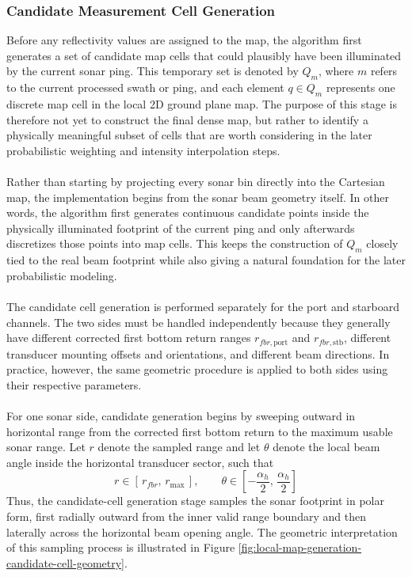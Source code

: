 \subsubsection{Candidate Measurement Cell Generation}
Before any reflectivity values are assigned to the map, the algorithm first generates a set of candidate map cells that could plausibly have been illuminated by the current sonar ping. This temporary set is denoted by $Q_m$, where $m$ refers to the current processed swath or ping, and each element $q \in Q_m$ represents one discrete map cell in the local 2D ground plane map. The purpose of this stage is therefore not yet to construct the final dense map, but rather to identify a physically meaningful subset of cells that are worth considering in the later probabilistic weighting and intensity interpolation steps.
\\ \\
Rather than starting by projecting every sonar bin directly into the Cartesian map, the implementation begins from the sonar beam geometry itself. In other words, the algorithm first generates continuous candidate points inside the physically illuminated footprint of the current ping and only afterwards discretizes those points into map cells. This keeps the construction of $Q_m$ closely tied to the real beam footprint while also giving a natural foundation for the later probabilistic modeling.
\\ \\
The candidate cell generation is performed separately for the port and starboard channels. The two sides must be handled independently because they generally have different corrected first bottom return ranges $r_{fbr,\mathrm{port}}$ and $r_{fbr,\mathrm{stb}}$, different transducer mounting offsets and orientations, and different beam directions. In practice, however, the same geometric procedure is applied to both sides using their respective parameters.
\\ \\
For one sonar side, candidate generation begins by sweeping outward in horizontal range from the corrected first bottom return to the maximum usable sonar range. Let $r$ denote the sampled range and let $\theta$ denote the local beam angle inside the horizontal transducer sector, such that
$$
    r \in [\, r_{fbr},\, r_{\max} \,],
    \qquad
    \theta \in \left[-\frac{\alpha_h}{2},\, \frac{\alpha_h}{2}\right]
$$
Thus, the candidate-cell generation stage samples the sonar footprint in polar form, first radially outward from the inner valid range boundary and then laterally across the horizontal beam opening angle. The geometric interpretation of this sampling process is illustrated in Figure \ref{fig:local-map-generation-candidate-cell-geometry}.
